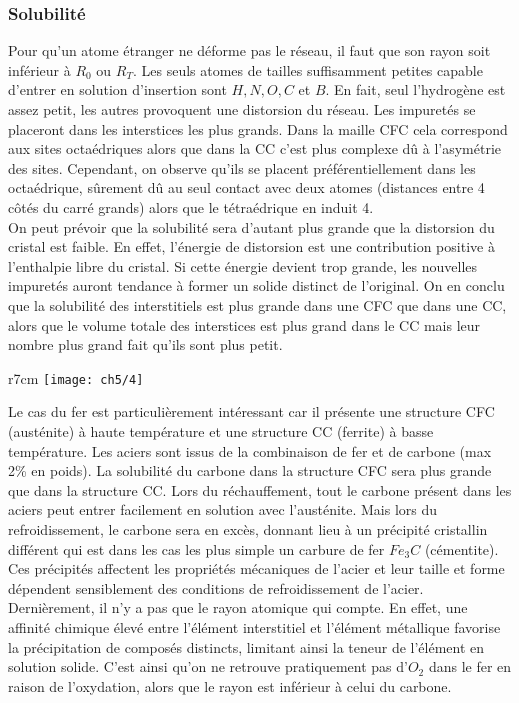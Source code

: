 	\subsubsection{Solubilité}
		Pour qu'un atome étranger ne déforme pas le réseau, il faut que son rayon soit inférieur à $R_0$ ou $R_T$. Les seuls atomes de tailles suffisamment petites capable d'entrer en solution d'insertion sont $H,N,O,C$ et $B$. En fait, seul l'hydrogène est assez petit, les autres provoquent une distorsion du réseau. Les impuretés se placeront dans les interstices les plus grands. Dans la maille CFC cela correspond aux sites octaédriques alors que dans la CC c'est plus complexe dû à l'asymétrie des sites. Cependant, on observe qu'ils se placent préférentiellement dans les octaédrique, sûrement dû au seul contact avec deux atomes (distances entre 4 côtés du carré grands) alors que le tétraédrique en induit 4. \\
	On peut prévoir que la solubilité sera d'autant plus grande que la distorsion du cristal est faible. En effet, l'énergie de distorsion est une contribution positive à l'enthalpie libre du cristal. Si cette énergie devient trop grande, les nouvelles impuretés auront tendance à former un solide distinct de l'original. On en conclu que la solubilité des interstitiels est plus grande dans une CFC que dans une CC, alors que le volume totale des interstices est plus grand dans le CC mais leur nombre plus grand fait qu'ils sont plus petit. \\
		
		\begin{wrapfigure}[9]{r}{7cm}
	\vspace{-10mm}
	\texttt{[image: ch5/4]}
	\end{wrapfigure}
		Le cas du fer est particulièrement intéressant car il présente une structure CFC (austénite) à haute température et une structure CC (ferrite) à basse température. Les aciers sont issus de la combinaison de fer et de carbone (max 2\% en poids). La solubilité du carbone dans la structure CFC sera plus grande que dans la structure CC. Lors du réchauffement, tout le carbone présent dans les aciers peut entrer facilement en solution avec l'austénite. Mais lors du refroidissement, le carbone sera en excès, donnant lieu à un précipité cristallin différent qui est dans les cas les plus simple un carbure de fer $Fe_3C$ (cémentite). Ces précipités affectent les propriétés mécaniques de l'acier et leur taille et forme dépendent sensiblement des conditions de refroidissement de l'acier. \\
		Dernièrement, il n'y a pas que le rayon atomique qui compte. En effet, une affinité chimique élevé entre l'élément interstitiel et l'élément métallique favorise la précipitation de composés distincts, limitant ainsi la teneur de l'élément en solution solide. C'est ainsi qu'on ne retrouve pratiquement pas d'$O_2$ dans le fer en raison de l'oxydation, alors que le rayon est inférieur à celui du carbone. 

